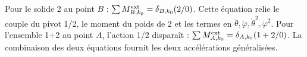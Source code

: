 \begin{corrigebox}
Pour le solide 2 au point $B$ :
                $\sum M_{B,k_0}^{\rm ext}=\delta_{B,k_0}(2/0)$. Cette équation relie le
                couple du pivot 1/2, le moment du poids de 2 et les termes en
                $\ddot\theta,\ddot\varphi,\dot\theta^2,\dot\varphi^2$.
Pour l'ensemble 1+2 au point $A$, l'action 1/2 disparaît :
                $\sum M_{A,k_0}^{\rm ext}=\delta_{A,k_0}(1+2/0)$. La combinaison des deux
                équations fournit les deux accélérations généralisées.
\end{corrigebox}
